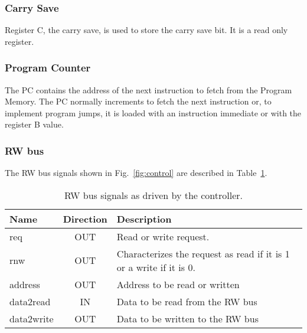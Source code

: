 \subsubsection{Carry Save}

Register C, the carry save, is used to store the carry save bit. It is
a read only register.

\subsubsection{Program Counter}

The PC contains the address of the next instruction to fetch from the
Program Memory. The PC normally increments to fetch the next
instruction or, to implement program jumps, it is loaded with an
instruction immediate or with the register B value.

\subsubsection{RW bus}
\label{sec:rwbus}


The RW bus signals shown in Fig.~\ref{fig:control} are described in
Table~\ref{tab:rwbus}.

\begin{table}[!htbp]
  \centering
    \begin{tabular}{|p{1.8cm}|c|p{10cm}|}
    \hline 
    {\bf Name} & {\bf Direction} & {\bf Description} \\
    \hline \hline 
     req & OUT & Read or write request.\\
    \hline
     rnw & OUT & Characterizes the request as read if it is 1 or a write if it is 0. \\
    \hline
     address & OUT & Address to be read or written \\
    \hline
     data2read & IN & Data to be read from the RW bus \\
    \hline
     data2write & OUT & Data to be written to the RW bus \\
    \hline

    \end{tabular}
  \caption{RW bus signals as driven by the controller.}
  \label{tab:rwbus}
\end{table}
